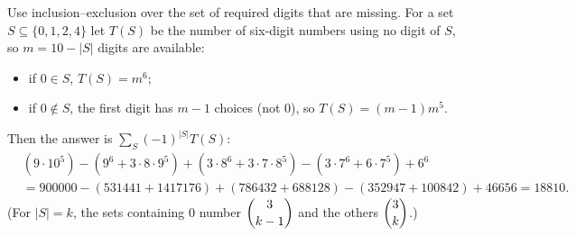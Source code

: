 Use inclusion--exclusion over the set of required digits that are missing. For a set $S\subseteq\{0,1,2,4\}$ let $T(S)$ be the number of six-digit numbers using no digit of $S$, so $m=10-|S|$ digits are available:
\begin{itemize}
\item if $0\in S$, $T(S)=m^6$;
\item if $0\notin S$, the first digit has $m-1$ choices (not $0$), so $T(S)=(m-1)m^5$.
\end{itemize}
Then the answer is $\sum_S(-1)^{|S|}T(S)$:
\begin{align*}
&\left(9\cdot10^5\right)-\left(9^6+3\cdot8\cdot9^5\right)+\left(3\cdot8^6+3\cdot7\cdot8^5\right)-\left(3\cdot7^6+6\cdot7^5\right)+6^6\\
&=900000-(531441+1417176)+(786432+688128)-(352947+100842)+46656=\boxed{18810}.
\end{align*}
(For $|S|=k$, the sets containing $0$ number $\dbinom3{k-1}$ and the others $\dbinom3k$.)

